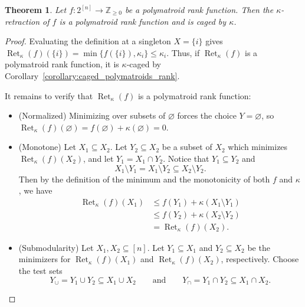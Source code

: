 \documentclass[10pt,a4paper]{amsart}
\newtheorem{theorem}{Theorem}[section]
\newcommand{\Zgeq}{\mathbb{Z}_{\geq 0}}       %
\DeclareMathOperator{\Ret}{Ret}                %
\newcommand{\RetK}{\Ret_{\kappa}}              %
\begin{document}
\begin{theorem}\label{thm:rank_retraction_is_polymatroid}
    Let $f\colon 2^{[n]}\rightarrow\Zgeq$ be a polymatroid rank
    function. Then the $\kappa$-retraction of $f$ is a polymatroid rank
    function and is caged by $\kappa$.
\end{theorem}

\begin{proof}
    Evaluating the definition at a singleton $X=\{i\}$ gives
    $\RetK(f)(\{i\})=\min\{f(\{i\}),\kappa_i\}\leq\kappa_i$.
    Thus, if $\RetK(f)$ is a polymatroid rank function, it is
    $\kappa$-caged by Corollary~\ref{corollary:caged_polymatroids_rank}.

    It remains to verify that $\RetK(f)$ is a polymatroid rank function:

    \begin{itemize}
        \item (Normalized) Minimizing over subsets of $\varnothing$ forces
        the choice $Y=\varnothing$, so
        $\RetK(f)(\varnothing)=f(\varnothing)+\kappa(\varnothing)=0$.

        \item (Monotone) Let $X_1\subseteq X_2$. Let
        $Y_2\subseteq X_2$ be a subset of $X_2$ which minimizes
        $\RetK(f)(X_2)$, and let $Y_1=X_1\cap Y_2$. Notice that
        $Y_1\subseteq Y_2$ and
        \[
            X_1\setminus Y_1
            =
            X_1\setminus Y_2
            \subseteq
            X_2\setminus Y_2.
        \]
        Then by the definition of the minimum and the monotonicity of both
        $f$ and $\kappa$, we have
        \begin{align*}
            \RetK(f)(X_1)
            &\leq f(Y_1)+\kappa(X_1\setminus Y_1) \\
            &\leq f(Y_2)+\kappa(X_2\setminus Y_2) \\
            &=\RetK(f)(X_2).
        \end{align*}

        \item (Submodularity) Let $X_1,X_2\subseteq[n]$. Let
        $Y_1\subseteq X_1$ and $Y_2\subseteq X_2$ be the minimizers for
        $\RetK(f)(X_1)$ and $\RetK(f)(X_2)$, respectively. Choose the test
        sets
        \[
            Y_{\cup}=Y_1\cup Y_2\subseteq X_1\cup X_2
            \qquad\text{and}\qquad
            Y_{\cap}=Y_1\cap Y_2\subseteq X_1\cap X_2.
        \]


\end{itemize}
\end{proof}
\end{document}
